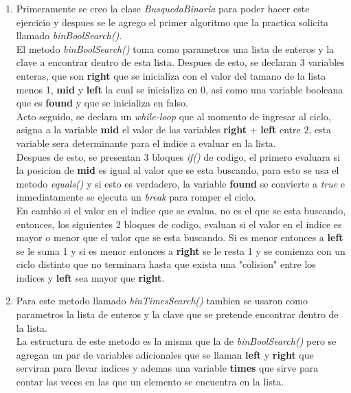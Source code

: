 \documentclass{article}
\begin{document}
				\begin{enumerate}
					\item Primeramente se creo la clase \emph{BusquedaBinaria} para poder hacer este ejercicio y despues se le agrego el primer algoritmo que la practica solicita llamado \emph{binBoolSearch()}.\\
					
					El metodo \emph{binBoolSearch()} toma como parametros una lista de enteros y la clave a encontrar dentro de esta lista. Despues de esto, se declaran 3 variables enteras, que son \textbf{right} que se inicializa con el valor del tamano de la lista menos 1, \textbf{mid} y \textbf{left} la cual se inicializa en 0, asi como una variable booleana que es \textbf{found} y que se inicializa en falso.\\	
					
					Acto seguido, se declara un \emph{while-loop} que al momento de ingresar al ciclo, asigna a la variable \textbf{mid} el valor de las variables \textbf{right} + \textbf{left} entre 2, esta variable sera determinante para el indice a evaluar en la lista.\\
					
					Despues de esto, se presentan 3 bloques \emph{if()} de codigo, el primero evaluara si la posicion de \textbf{mid} es igual al valor que se esta buscando, para esto se usa el metodo \emph{equals()} y si esto es verdadero, la variable \textbf{found} se convierte a \emph{true} e inmediatamente se ejecuta un \emph{break} para romper el ciclo.\\
					
					En cambio si el valor en el indice que se evalua, no es el que 
					se esta buscando, entonces, los siguientes 2 bloques de codigo, evaluan si el valor en el indice es mayor o menor que el valor que se esta buscando. Si es menor entonces a \textbf{left} se le suma 1 y si es menor entonces a \textbf{right} se le resta 1 y se comienza con un ciclo distinto que no terminara hasta que exista una "colision" entre los indices y \textbf{left} sea mayor que \textbf{right}.\\
					
					\item Para este metodo llamado \emph{binTimesSearch()} tambien se usaron como parametros la lista de enteros y la clave que se pretende encontrar dentro de la lista.\\
					
					La estructura de este metodo es la misma que la de \emph{binBoolSearch()} pero se agregan un par de variables adicionales que se llaman \textbf{left} y \textbf{right} que serviran para llevar indices y ademas una variable \textbf{times} que sirve para contar las veces en las que un elemento se encuentra en la lista.\\
					

\end{enumerate}
\end{document}
